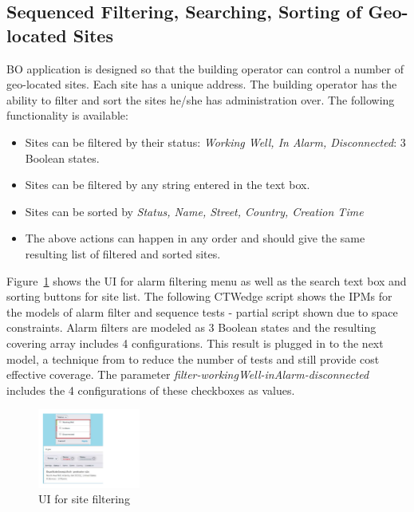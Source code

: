 \documentclass[conference]{IEEEtran}
\begin{document}
	\subsection{Sequenced Filtering, Searching, Sorting of Geo-located Sites}

	BO application is designed so that the building operator can control a number of geo-located sites. 
	Each site has a unique address. The building operator has the ability to filter and sort the sites he/she has administration over.
	The following functionality is available:
	\begin{itemize}
		\item Sites can be filtered by their status: \textit{Working Well, In Alarm, Disconnected}: 3 Boolean states.
		\item Sites can be filtered by any string entered in the text box.
		\item Sites can be sorted by \textit{Status, Name, Street, Country, Creation Time}
		\item The above actions can happen in any order and should give the same resulting list of filtered and sorted sites.
	\end{itemize}

	Figure~\ref{fig:siteFilterModel} shows the UI for alarm filtering menu as well as the search text box and sorting buttons for site list. 
	The following CTWedge script shows the IPMs for the models of alarm filter and sequence tests - partial script shown due to space constraints. 
	Alarm filters are modeled as 3 Boolean states and the resulting covering array includes 4 configurations. 
	This result is plugged in to the next model, a technique from \cite{ozcan2017applications} to reduce the number of tests and still provide cost effective coverage.
	The parameter \textit{filter-workingWell-inAlarm-disconnected} includes the 4 configurations of these checkboxes as values. 

	\begin{figure}[!b]
		\centering
			\includegraphics[width=0.30\textwidth,]{siteFilterModel.pdf}
			\caption{UI for site filtering}
			\label{fig:siteFilterModel}
	\end{figure}
\end{document}
